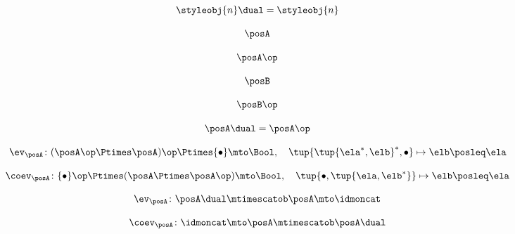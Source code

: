 {\begin{forslides}
    \begin{equation}
        \label{eq:slides_trace_monoidal_21}
        \styleobj{n}\dual = \styleobj{n}
    \end{equation}

    \begin{equation}
        \label{eq:slides_trace_monoidal_22}
        \posA
    \end{equation}

    \begin{equation}
        \label{eq:slides_trace_monoidal_23}
        \posA\op
    \end{equation}

    \begin{equation}
        \label{eq:slides_trace_monoidal_24}
        \posB
    \end{equation}

    \begin{equation}
        \label{eq:slides_trace_monoidal_25}
        \posB\op
    \end{equation}

    \begin{equation}
        \label{eq:slides_trace_monoidal_26}
        \posA\dual = \posA\op
    \end{equation}

    \begin{equation}
        \label{eq:slides_trace_monoidal_27}
        \ev_\posA \colon (\posA\op \Ptimes \posA)\op \Ptimes \{ \bullet \} \mto \Bool, \quad \tup{\tup{\ela^*, \elb}^*, \bullet} \mapsto \elb \posleq \ela
    \end{equation}

    \begin{equation}
        \label{eq:slides_trace_monoidal_28}
        \coev_\posA \colon \{ \bullet \}\op \Ptimes (\posA \Ptimes \posA\op)   \mto \Bool, \quad \tup{\bullet, \tup{\ela, \elb^*}} \mapsto \elb \posleq \ela
    \end{equation}

    \begin{equation}
        \label{eq:slides_trace_monoidal_29}
        \ev_\posA \colon \posA\dual \mtimescatob \posA \mto \idmoncat
    \end{equation}

    \begin{equation}
        \label{eq:slides_trace_monoidal_30}
        \coev_\posA \colon \idmoncat \mto \posA \mtimescatob \posA\dual
    \end{equation}


\end{forslides}}
